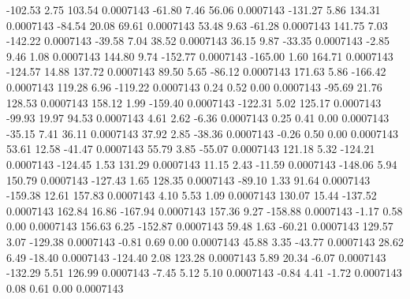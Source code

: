      -102.53        2.75      103.54     0.0007143
      -61.80        7.46       56.06     0.0007143
     -131.27        5.86      134.31     0.0007143
      -84.54       20.08       69.61     0.0007143
       53.48        9.63      -61.28     0.0007143
      141.75        7.03     -142.22     0.0007143
      -39.58        7.04       38.52     0.0007143
       36.15        9.87      -33.35     0.0007143
       -2.85        9.46        1.08     0.0007143
      144.80        9.74     -152.77     0.0007143
     -165.00        1.60      164.71     0.0007143
     -124.57       14.88      137.72     0.0007143
       89.50        5.65      -86.12     0.0007143
      171.63        5.86     -166.42     0.0007143
      119.28        6.96     -119.22     0.0007143
        0.24        0.52        0.00     0.0007143
      -95.69       21.76      128.53     0.0007143
      158.12        1.99     -159.40     0.0007143
     -122.31        5.02      125.17     0.0007143
      -99.93       19.97       94.53     0.0007143
        4.61        2.62       -6.36     0.0007143
        0.25        0.41        0.00     0.0007143
      -35.15        7.41       36.11     0.0007143
       37.92        2.85      -38.36     0.0007143
       -0.26        0.50        0.00     0.0007143
       53.61       12.58      -41.47     0.0007143
       55.79        3.85      -55.07     0.0007143
      121.18        5.32     -124.21     0.0007143
     -124.45        1.53      131.29     0.0007143
       11.15        2.43      -11.59     0.0007143
     -148.06        5.94      150.79     0.0007143
     -127.43        1.65      128.35     0.0007143
      -89.10        1.33       91.64     0.0007143
     -159.38       12.61      157.83     0.0007143
        4.10        5.53        1.09     0.0007143
      130.07       15.44     -137.52     0.0007143
      162.84       16.86     -167.94     0.0007143
      157.36        9.27     -158.88     0.0007143
       -1.17        0.58        0.00     0.0007143
      156.63        6.25     -152.87     0.0007143
       59.48        1.63      -60.21     0.0007143
      129.57        3.07     -129.38     0.0007143
       -0.81        0.69        0.00     0.0007143
       45.88        3.35      -43.77     0.0007143
       28.62        6.49      -18.40     0.0007143
     -124.40        2.08      123.28     0.0007143
        5.89       20.34       -6.07     0.0007143
     -132.29        5.51      126.99     0.0007143
       -7.45        5.12        5.10     0.0007143
       -0.84        4.41       -1.72     0.0007143
        0.08        0.61        0.00     0.0007143
